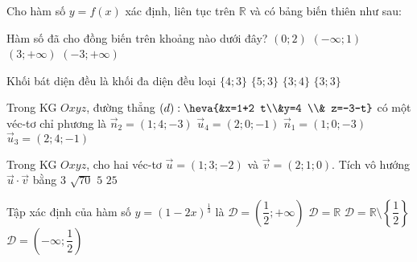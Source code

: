 \begin{ex}%
	Cho hàm số $y=f(x)$ xác định, liên tục trên $\mathbb{R}$ và có bảng biến thiên như sau:
	\begin{center}
	\end{center}
	Hàm số đã cho đồng biến trên khoảng nào dưới đây?
	\choice
	{$(0; 2)$}
	{$(-\infty; 1)$}
	{\True $(3;+\infty)$}
	{$(-3;+\infty)$}
\end{ex}
\begin{ex}%
	Khối bát diện đều là khối đa diện đều loại
	\choice
	{$\{4; 3\}$}
	{$\{5; 3\}$}
	{\True $\{3; 4\}$}
	{$\{3; 3\}$}
\end{ex}

\begin{ex}%
	Trong KG $Oxyz$, đường thẳng $(d):\heva{&x=1+2 t\\&y=4 \\& z=-3-t}$ có một véc-tơ chỉ phương là
	\choice
	{$\vec{n}_2=(1; 4;-3)$}
	{\True $\vec{u}_4=(2; 0;-1)$}
	{$\vec{n}_1=(1; 0;-3)$}
	{$\vec{u}_3=(2; 4;-1)$}
\end{ex}
\begin{ex}%
	Trong KG $Oxyz$, cho hai véc-tơ $\vec{u}=(1; 3;-2)$ và $\vec{v}=(2; 1; 0)$. Tích vô hướng $\vec{u}\cdot \vec{v}$ bằng
	\choice
	{$3$}
	{$\sqrt{70}$}
	{\True $5$}
	{$25$}
\end{ex}
\begin{ex}%
	Tập xác định của hàm số $y=(1-2x)^{\frac{1}{3}}$ là
	\choice
	{$\mathscr{D}=\left(\dfrac{1}{2};+\infty\right)$}
	{$\mathscr{D}=\mathbb{R}$}
	{$\mathscr{D}=\mathbb{R}\setminus \left\{\dfrac{1}{2}\right\}$}
	{\True $\mathscr{D}=\left(-\infty; \dfrac{1}{2}\right)$}
\end{ex}

